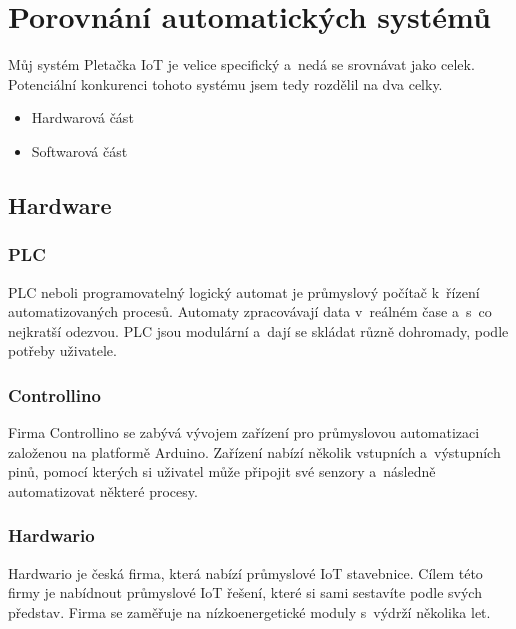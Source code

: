 \chapter{Porovnání automatických systémů}
Můj systém Pletačka IoT je velice specifický a~nedá se srovnávat jako celek. 
Potenciální konkurenci tohoto systému jsem tedy rozdělil na dva celky.

\begin{itemize} %
    \item Hardwarová část
    \item Softwarová část
\end{itemize}



\section{Hardware}

\subsection{PLC}
PLC neboli programovatelný logický automat je průmyslový počítač k~řízení automatizovaných procesů.
Automaty zpracovávají data v~reálném čase a~s~co nejkratší odezvou.
PLC jsou modulární a~dají se skládat různě dohromady, podle potřeby uživatele.



\subsection{Controllino}
Firma Controllino \cite{CONTROLLINO} se zabývá vývojem zařízení pro průmyslovou automatizaci založenou na platformě Arduino.
Zařízení nabízí několik vstupních a~výstupních pinů, pomocí kterých si uživatel může připojit své senzory a~následně automatizovat některé procesy. 




\subsection{Hardwario}
Hardwario \cite{HARDWARIO} je česká firma, která nabízí průmyslové IoT stavebnice.
Cílem této firmy je nabídnout průmyslové IoT řešení, které si sami sestavíte podle svých představ.
Firma se zaměřuje na nízkoenergetické moduly s~výdrží několika let.



